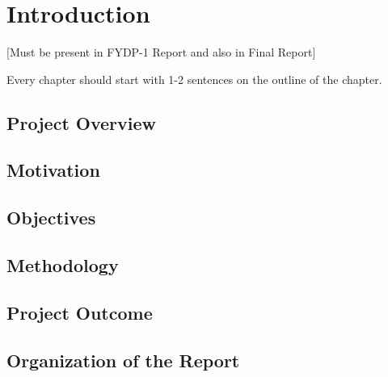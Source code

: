 \chapter{Introduction}
[Must be present in FYDP-1 Report and also in Final Report]


Every chapter should start with 1-2 sentences on the outline of the chapter.

\section{Project Overview}
\section{Motivation}
\section{Objectives}
\section{Methodology}
\section{Project Outcome}
\section{Organization of the Report}
